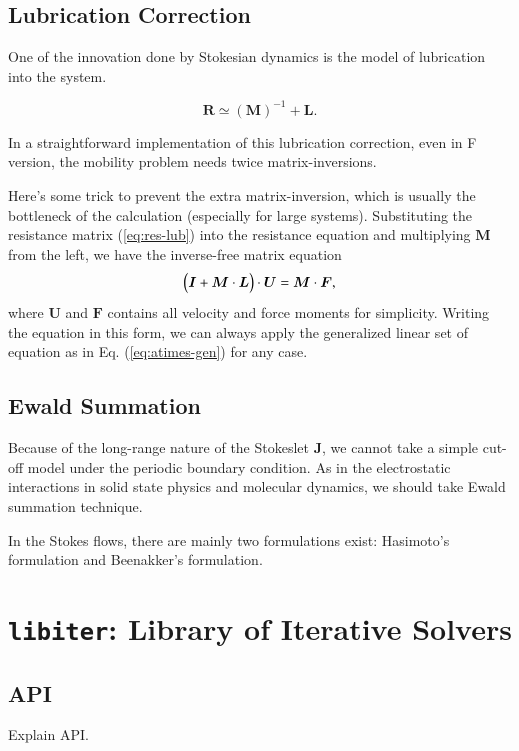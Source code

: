 \documentclass{book}
\begin{document}
\section{Lubrication Correction}
One of the innovation done by Stokesian dynamics
\cite{BradyBossis1988,DurlofskyEtal1987,BradyEtal1988}
is the model of lubrication into the system.

\begin{equation}
  \bm{R}
  \simeq
  \left(
    \bm{M}
  \right)^{-1}
  +
  \bm{L}
  .
  \label{eq:res-lub}
\end{equation}

In a straightforward implementation of this lubrication correction,
even in F version, the mobility problem needs twice matrix-inversions.

Here's some trick to prevent the extra matrix-inversion,
which is usually the bottleneck of the calculation
(especially for large systems).
Substituting the resistance matrix (\ref{eq:res-lub})
into the resistance equation and multiplying $\bm{M}$ from the left,
we have the inverse-free matrix equation
\begin{equation}
  \Bigl(
    \bm{I}
    +
    \bm{M}
    \cdot
    \bm{L}
  \Bigr)
  \cdot
  \bm{U}
  =
  \bm{M}
  \cdot
  \bm{F}
  ,
\end{equation}
where $\bm{U}$ and $\bm{F}$ contains all velocity and force moments
for simplicity.
Writing the equation in this form,
we can always apply the generalized linear set of equation
as in Eq. (\ref{eq:atimes-gen}) for any case.


\section{Ewald Summation}
Because of the long-range nature of the Stokeslet $\bm{J}$,
we cannot take a simple cut-off model under the periodic
boundary condition. As in the electrostatic interactions
in solid state physics and molecular dynamics, we should
take Ewald summation technique.

In the Stokes flows, there are mainly two formulations exist:
Hasimoto's formulation\cite{Hasimoto1959}
and Beenakker's formulation\cite{Beenakker1986}.




\chapter{{\tt libiter}: Library of Iterative Solvers}
\label{chp:libiter}
\section{API}
Explain API.
\end{document}
